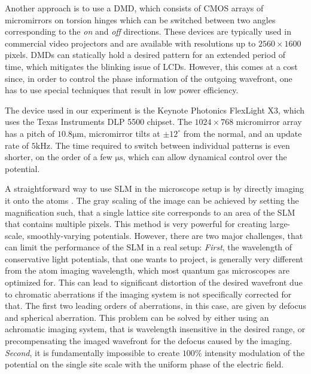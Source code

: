 Another approach is to use a DMD, which consists of CMOS arrays of micromirrors on torsion hinges which can be switched
between two angles corresponding to the \textit{on} and \textit{off} directions. These devices are typically used in commercial video projectors and are available with resolutions up to $2560 \times 1600$ pixels. DMDs can statically hold a desired pattern for an extended period of time, which mitigates the blinking issue of LCDs. However, this comes at a cost since, in order to control the phase information of the outgoing wavefront, one has to use special techniques\cite{Lee1970, Goorden2014} that result in low power efficiency. 

The device used in our experiment is the Keynote Photonics FlexLight X3, which uses the Texas Instruments DLP 5500 chipset. The $1024 \times 768$ micromirror array has a pitch of $10.8 \mathrm{\mu m}$, micromirror tilts at $\pm 12^{\circ}$ from the normal, and an update rate of $5 \mathrm{kHz}$. The time required to switch between individual patterns is even shorter, on the order of a few $\mathrm{\mu s}$, which can allow dynamical control over the potential.

A straightforward way to use SLM in the microscope setup is by directly imaging it onto the atoms \cite{MaThesis, MarurenkoThesis}. The gray scaling of the image can be achieved by setting the magnification such, that a single lattice site corresponds to an area of the SLM that contains multiple pixels. This method is very powerful for creating large-scale, smoothly-varying potentials. However, there are two major challenges, that can limit the performance of the SLM in a real setup: \textit{First}, the wavelength of conservative light potentials, that one wants to project, is generally very different from the atom imaging wavelength, which most quantum gas microscopes are optimized for. This can lead to significant distortion of the desired wavefront due to chromatic aberrations if the imaging system is not specifically corrected for that. The first two leading orders of aberrations, in this case, are given by defocus and spherical aberration. This problem can be solved by either using an achromatic imaging system, that is wavelength insensitive in the desired range, or precompensating the imaged wavefront for the defocus caused by the imaging. \textit{Second}, it is fundamentally impossible to create $100 \%$ intensity modulation of the potential on the single site scale with the uniform phase of the electric field. 

